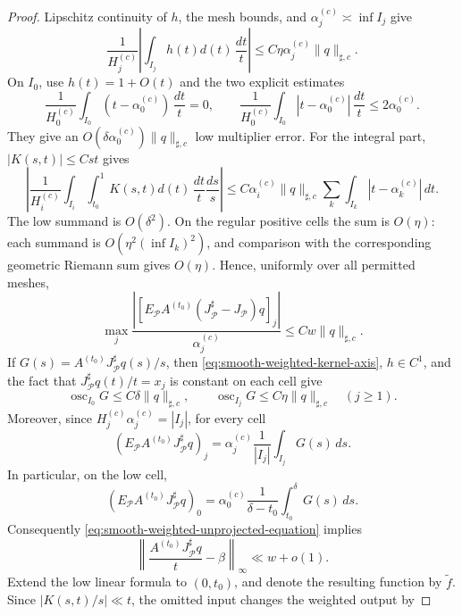 \documentclass[11pt]{article}
\numberwithin{equation}{section}
\theoremstyle{definition}
\theoremstyle{remark}
\newcommand{\1}{\mathbf 1}
\begin{document}
\begin{proof}
Lipschitz continuity of \(h\), the mesh bounds, and
\(\alpha_j^{(c)}\asymp\inf I_j\) give
\[
 \frac1{H_j^{(c)}}\left|
 \int_{I_j}h(t)d(t)\,\frac{dt}{t}\right|
 \leq C\eta\alpha_j^{(c)}\|q\|_{\sharp,c}.
\]
On \(I_0\), use \(h(t)=1+O(t)\) and the two explicit estimates
\[
 \frac1{H_0^{(c)}}\int_{I_0}(t-\alpha_0^{(c)})\,\frac{dt}{t}=0,
 \qquad
 \frac1{H_0^{(c)}}\int_{I_0}|t-\alpha_0^{(c)}|\,\frac{dt}{t}
 \leq2\alpha_0^{(c)}.
\]
They give an \(O(\delta\alpha_0^{(c)})\|q\|_{\sharp,c}\) low multiplier
error.  For the integral part, \(|K(s,t)|\leq Cst\) gives
\[
 \left|\frac1{H_i^{(c)}}\int_{I_i}\int_{t_0}^1
       K(s,t)d(t)\,\frac{dt}{t}\frac{ds}{s}\right|
 \leq C\alpha_i^{(c)}\|q\|_{\sharp,c}
       \sum_k\int_{I_k}|t-\alpha_k^{(c)}|\,dt.
\]
The low summand is \(O(\delta^2)\).  On the regular positive cells the
sum is \(O(\eta)\): each summand is
\(O(\eta^2(\inf I_k)^2)\), and comparison with the corresponding
geometric Riemann sum gives \(O(\eta)\).  Hence, uniformly over all
permitted meshes,
\begin{equation}
 \max_j\frac{\left|
   [E_{\mathcal P}A^{(t_0)}(J_{\mathcal P}^\sharp-J_{\mathcal P})q]_j
                 \right|}{\alpha_j^{(c)}}
 \le Cw\|q\|_{\sharp,c}.
 \label{eq:smooth-step-linear-reconstruction-error}
\end{equation}
If
\(G(s)=A^{(t_0)}J_{\mathcal P}^\sharp q(s)/s\), then
\eqref{eq:smooth-weighted-kernel-axis}, \(h\in C^1\), and the fact that
\(J_{\mathcal P}^\sharp q(t)/t=x_j\) is constant on each cell give
\[
 \operatorname{osc}_{I_0}G\leq C\delta\|q\|_{\sharp,c},\qquad
\operatorname{osc}_{I_j}G\leq C\eta\|q\|_{\sharp,c}\quad(j\geq1).
\]
Moreover, since
\(H_j^{(c)}\alpha_j^{(c)}=|I_j|\), for every cell
\begin{equation}
 (E_{\mathcal P}A^{(t_0)}J_{\mathcal P}^\sharp q)_j
 =\alpha_j^{(c)}\frac1{|I_j|}\int_{I_j}G(s)\,ds.
 \label{eq:smooth-sharp-average-to-pointwise}
\end{equation}
In particular, on the low cell,
\[
 (E_{\mathcal P}A^{(t_0)}J_{\mathcal P}^\sharp q)_0
 =\alpha_0^{(c)}\frac1{\delta-t_0}
       \int_{t_0}^{\delta}G(s)\,ds.
\]
Consequently \eqref{eq:smooth-weighted-unprojected-equation} implies
\begin{equation}
 \left\|\frac{A^{(t_0)}J_{\mathcal P}^\sharp q}{t}-\beta\right\|_\infty
 \ll w+o(1).
 \label{eq:smooth-weighted-reconstructed-equation}
\end{equation}
Extend the low linear formula to \((0,t_0)\), and denote the resulting
function by \(\widetilde f\).  Since
\(|K(s,t)/s|\ll t\), the omitted input changes the weighted output by

\end{proof}
\end{document}
